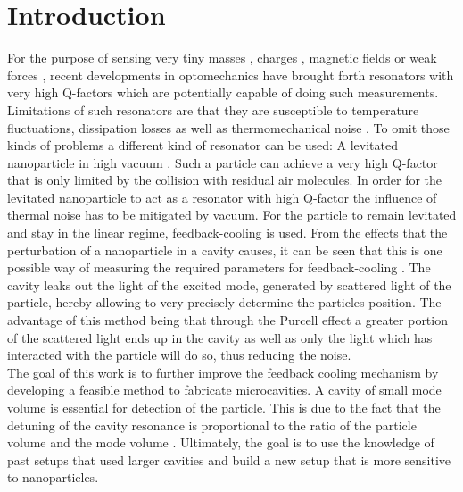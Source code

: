 \chapter{Introduction}
For the purpose of sensing very tiny masses \cite{chaste2012nanomechanical, yang2006zeptogram}, charges \cite{cleland1998nanometre}, magnetic fields \cite{rugar2004single} or weak forces \cite{stipe2001noncontact, moser2013ultrasensitive}, recent developments in optomechanics \cite{arndt2014testing, aspelmeyer2012quantum, aspelmeyer2014cavity} have brought forth resonators with very high Q-factors which are potentially capable of doing such measurements. Limitations of such resonators are that they are susceptible to temperature fluctuations, dissipation losses as well as thermomechanical noise \cite{ekinci2004ultimate, aspelmeyer2012quantum, postma2005dynamic}. To omit those kinds of problems a different kind of resonator can be used: A levitated nanoparticle in high vacuum \cite{gieseler2013thermal}. Such a particle can achieve a very high Q-factor that is only limited by the collision with residual air molecules. In order for the levitated nanoparticle to act as a resonator with high Q-factor the influence of thermal noise has to be mitigated by vacuum. For the particle to remain levitated and stay in the linear regime, feedback-cooling is used. From the effects that the perturbation of a nanoparticle in a cavity causes, it can be seen that this is one possible way of measuring the required parameters for feedback-cooling \cite{tanjiinteraction, chang2010cavity}. The cavity leaks out the light of the excited mode, generated by scattered light of the particle, hereby allowing to very precisely determine the particles position. The advantage of this method being that through the Purcell effect a greater portion of the scattered light ends up in the cavity as well as only the light which has interacted with the particle will do so, thus reducing the noise.\\
The goal of this work is to further improve the feedback cooling mechanism by developing a feasible method to fabricate microcavities. A cavity of small mode volume is essential for detection of the particle. This is due to the fact that the detuning of the cavity resonance is proportional to the ratio of the particle volume and the mode volume \cite{chang2010cavity}. Ultimately, the goal is to use the knowledge of past setups that used larger cavities and build a new setup that is more sensitive to nanoparticles.







